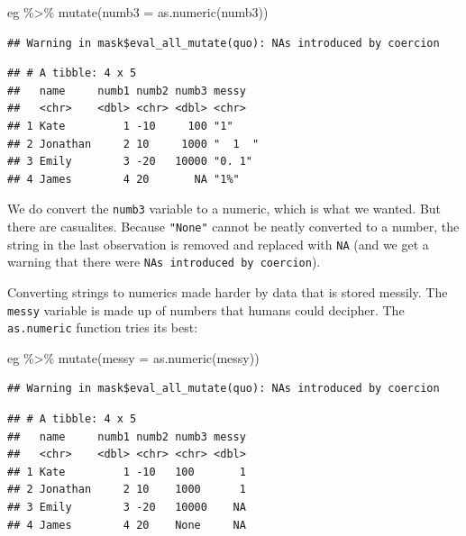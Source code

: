 \documentclass[
]{book}
\newenvironment{Shaded}{\begin{snugshade}}{\end{snugshade}}
\newcommand{\AttributeTok}[1]{\textcolor[rgb]{0.77,0.63,0.00}{#1}}
\newcommand{\FunctionTok}[1]{\textcolor[rgb]{0.00,0.00,0.00}{#1}}
\newcommand{\NormalTok}[1]{#1}
\newcommand{\SpecialCharTok}[1]{\textcolor[rgb]{0.00,0.00,0.00}{#1}}
\begin{document}
\begin{Shaded}
\begin{Highlighting}[]
\NormalTok{eg }\SpecialCharTok{\%\textgreater{}\%} 
  \FunctionTok{mutate}\NormalTok{(}\AttributeTok{numb3 =} \FunctionTok{as.numeric}\NormalTok{(numb3))}
\end{Highlighting}
\end{Shaded}

\begin{verbatim}
## Warning in mask$eval_all_mutate(quo): NAs introduced by coercion
\end{verbatim}

\begin{verbatim}
## # A tibble: 4 x 5
##   name     numb1 numb2 numb3 messy  
##   <chr>    <dbl> <chr> <dbl> <chr>  
## 1 Kate         1 -10     100 "1"    
## 2 Jonathan     2 10     1000 "  1  "
## 3 Emily        3 -20   10000 "0. 1" 
## 4 James        4 20       NA "1%"
\end{verbatim}

We do convert the \texttt{numb3} variable to a numeric, which is what we wanted. But there are casualites. Because \texttt{"None"} cannot be neatly converted to a number, the string in the last observation is removed and replaced with \texttt{NA} (and we get a warning that there were \texttt{NAs\ introduced\ by\ coercion}).

Converting strings to numerics made harder by data that is stored messily. The \texttt{messy} variable is made up of numbers that humans could decipher. The \texttt{as.numeric} function tries its best:

\begin{Shaded}
\begin{Highlighting}[]
\NormalTok{eg }\SpecialCharTok{\%\textgreater{}\%} 
  \FunctionTok{mutate}\NormalTok{(}\AttributeTok{messy =} \FunctionTok{as.numeric}\NormalTok{(messy))}
\end{Highlighting}
\end{Shaded}

\begin{verbatim}
## Warning in mask$eval_all_mutate(quo): NAs introduced by coercion
\end{verbatim}

\begin{verbatim}
## # A tibble: 4 x 5
##   name     numb1 numb2 numb3 messy
##   <chr>    <dbl> <chr> <chr> <dbl>
## 1 Kate         1 -10   100       1
## 2 Jonathan     2 10    1000      1
## 3 Emily        3 -20   10000    NA
## 4 James        4 20    None     NA
\end{verbatim}
\end{document}
